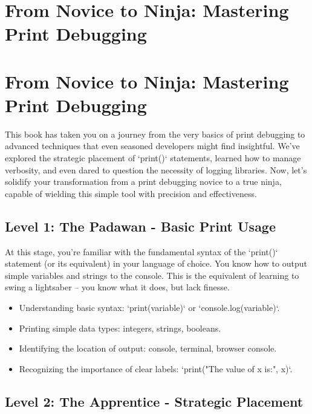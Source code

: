 \documentclass{article}
\begin{document}
{{{{\section*{From Novice to Ninja: Mastering Print Debugging} %
\label{chapter-10-8-From_Novice_to_Ninja__Mastering_Print_De}

\section*{From Novice to Ninja: Mastering Print Debugging}

This book has taken you on a journey from the very basics of print debugging to advanced techniques that even seasoned developers might find insightful. We've explored the strategic placement of `print()` statements, learned how to manage verbosity, and even dared to question the necessity of logging libraries. Now, let's solidify your transformation from a print debugging novice to a true ninja, capable of wielding this simple tool with precision and effectiveness.

\subsection*{Level 1: The Padawan - Basic Print Usage}

At this stage, you're familiar with the fundamental syntax of the `print()` statement (or its equivalent) in your language of choice. You know how to output simple variables and strings to the console. This is the equivalent of learning to swing a lightsaber – you know what it does, but lack finesse.

\begin{itemize}
    \item Understanding basic syntax:  `print(variable)` or `console.log(variable)`.
    \item Printing simple data types: integers, strings, booleans.
    \item Identifying the location of output: console, terminal, browser console.
    \item Recognizing the importance of clear labels: `print("The value of x is:", x)`.
\end{itemize}

\subsection*{Level 2: The Apprentice - Strategic Placement}

}}}}
\end{document}
